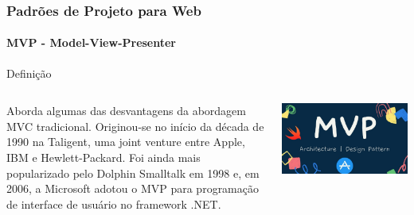 \documentclass[
	9pt, %
	t, %
]{beamer}
\begin{document}
\begin{frame}
	\frametitle{Padrões de Projeto para Web}
	\framesubtitle{MVP - Model-View-Presenter}

	\begin{block}{Definição}
		\begin{columns}[c] %
			\begin{column}{0.8\textwidth} %
				Aborda algumas das desvantagens da abordagem MVC tradicional. Originou-se no início da década de 1990 na Taligent, uma joint venture entre Apple, IBM e Hewlett-Packard. Foi ainda mais popularizado pelo Dolphin Smalltalk em 1998 e, em 2006, a Microsoft adotou o MVP para programação de interface de usuário no framework .NET.
			\end{column}

			\begin{column}{0.2\textwidth} %
				\includegraphics[width=0.9\linewidth]{Images/mvp_logo.jpg}
			\end{column}
		\end{columns}
	\end{block}

\end{frame}
\end{document}
